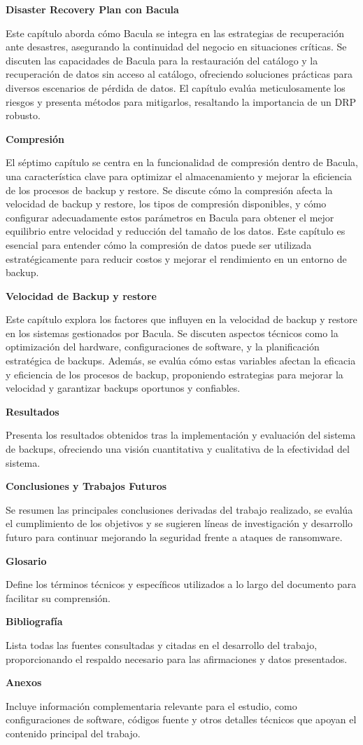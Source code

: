 \textbf{Disaster Recovery Plan con Bacula}

Este capítulo aborda cómo Bacula se integra en las estrategias de recuperación ante desastres, asegurando la continuidad del negocio en situaciones críticas. Se discuten las capacidades de Bacula para la restauración del catálogo y la recuperación de datos sin acceso al catálogo, ofreciendo soluciones prácticas para diversos escenarios de pérdida de datos. El capítulo evalúa meticulosamente los riesgos y presenta métodos para mitigarlos, resaltando la importancia de un DRP robusto.\bigskip

\textbf{Compresión}

El séptimo capítulo se centra en la funcionalidad de compresión dentro de Bacula, una característica clave para optimizar el almacenamiento y mejorar la eficiencia de los procesos de backup y restore. Se discute cómo la compresión afecta la velocidad de backup y restore, los tipos de compresión disponibles, y cómo configurar adecuadamente estos parámetros en Bacula para obtener el mejor equilibrio entre velocidad y reducción del tamaño de los datos. Este capítulo es esencial para entender cómo la compresión de datos puede ser utilizada estratégicamente para reducir costos y mejorar el rendimiento en un entorno de backup.\bigskip

\textbf{Velocidad de Backup y restore}

Este capítulo explora los factores que influyen en la velocidad de backup y restore en los sistemas gestionados por Bacula. Se discuten aspectos técnicos como la optimización del hardware, configuraciones de software, y la planificación estratégica de backups. Además, se evalúa cómo estas variables afectan la eficacia y eficiencia de los procesos de backup, proponiendo estrategias para mejorar la velocidad y garantizar backups oportunos y confiables.\bigskip



\textbf{Resultados}

Presenta los resultados obtenidos tras la implementación y evaluación del sistema de backups, ofreciendo una visión cuantitativa y cualitativa de la efectividad del sistema.\bigskip

\textbf{Conclusiones y Trabajos Futuros}

Se resumen las principales conclusiones derivadas del trabajo realizado, se evalúa el cumplimiento de los objetivos y se sugieren líneas de investigación y desarrollo futuro para continuar mejorando la seguridad frente a ataques de ransomware.\bigskip

\textbf{Glosario}

Define los términos técnicos y específicos utilizados a lo largo del documento para facilitar su comprensión.\bigskip

\textbf{Bibliografía}

Lista todas las fuentes consultadas y citadas en el desarrollo del trabajo, proporcionando el respaldo necesario para las afirmaciones y datos presentados.\bigskip

\textbf{Anexos}

Incluye información complementaria relevante para el estudio, como configuraciones de software, códigos fuente y otros detalles técnicos que apoyan el contenido principal del trabajo.\bigskip
